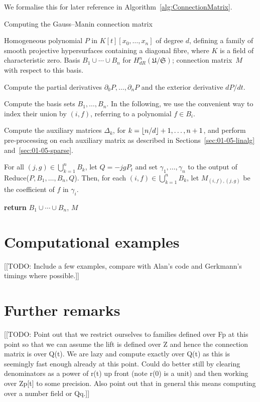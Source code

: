 We formalise this for later reference in Algorithm~\ref{alg:ConnectionMatrix}.

\begin{algorithm}
\caption{Computing the Gauss--Manin connection matrix}
\label{alg:ConnectionMatrix}
\begin{algorithmic}
\Require Homogeneous polynomial $P$ in $K[t][x_0, \dotsc, x_n]$ of degree $d$, 
         defining a family of smooth projective hypersurfaces containing 
         a diagonal fibre, where $K$ is a field of characteristic zero.
\Ensure  Basis $B_1 \cup \dotsb \cup B_n$ for 
         $H_{dR}^n(\mathfrak{U}/\mathfrak{S})$;  connection matrix~$M$ with 
         respect to this basis.
\State \begin{compactenum}[\it {Step} I.] \vspace{-1.24em}
\item Compute the partial derivatives $\partial_0 P, \dotsc, \partial_n P$ and 
      the exterior derivative $dP/dt$.
\item Compute the basis sets $B_1, \dotsc, B_n$.  In the following, we use the 
      convenient way to index their union by $(i,f)$, referring to a 
      polynomial $f \in B_i$.
\item Compute the auxiliary matrices $\Delta_k$, for 
      $k = \left\lfloor n/d\right\rfloor+1, \dotsc, n+1$, and perform pre-processing on each 
      auxiliary matrix as described in 
      Sections~\ref{sec:01-05-linalg} 
      and~\ref{sec:01-05-sparse}.
\item For all $(j, g) \in \bigcup_{k=1}^n B_k$, let $Q = -j g P_t$ and set 
      $\gamma_{1}, \dotsc, \gamma_n$ to the output of 
      {\sc Reduce($P, B_1, \dotsc, B_n, Q$)}.  
      Then, for each $(i, f) \in \bigcup_{k=1}^n B_k$, let $M_{(i,f),(j,g)}$ 
      be the coefficient of $f$ in $\gamma_i$.
\item \textbf{return} $B_1 \cup \dotsb \cup B_n$, $M$
\end{compactenum}
\EndProcedure
\end{algorithmic}
\end{algorithm}

\section{Computational examples}

[[TODO:  Include a few examples, compare with Alan's code and 
Gerkmann's timings where possible.]]

\section{Further remarks}

[[TODO:  Point out that we restrict ourselves to families defined 
over Fp at this point so that we can assume the lift is defined 
over Z and hence the connection matrix is over Q(t).  We are lazy 
and compute exactly over Q(t) as this is seemingly fast enough 
already at this point.  Could do better still by clearing denominators 
as a power of r(t) up front (note r(0) is a unit) and then working 
over Zp[t] to some precision.  Also point out that in general this 
means computing over a number field or Qq.]]

